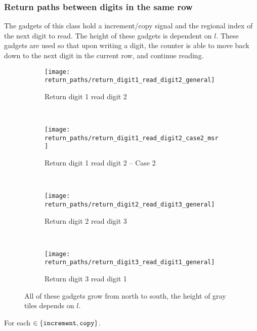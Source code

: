 \subsubsection{Return paths between digits in the same row}
The gadgets of this class hold a increment/copy signal and the regional index
of the next digit to read. The height of these gadgets is dependent on $l$.
These gadgets are used so that upon writing a digit, the counter
is able to move back down to the next digit in the current row, and continue
reading.
\vspace{1cm}

\begin{figure}[H]
    \centering
    \begin{subfigure}[t]{0.2\textwidth}
        \centering
        \texttt{[image: return\_paths/return\_digit1\_read\_digit2\_general]}
        \caption{\label{fig:return_digit1_read_digit2_general} Return digit 1 read digit 2}
    \end{subfigure}%
    ~
    \begin{subfigure}[t]{0.2\textwidth}
        \centering
        \texttt{[image: return\_paths/return\_digit1\_read\_digit2\_case2\_msr]}
        \caption{\label{fig:return_digit1_read_digit2_case2_msr} Return digit 1 read digit 2 -- Case 2}
    \end{subfigure}%
    ~
    \begin{subfigure}[t]{0.2\textwidth}
        \centering
        \texttt{[image: return\_paths/return\_digit2\_read\_digit3\_general]}
        \caption{\label{fig:return_digit2_read_digit3_general} Return digit 2 read digit 3}
    \end{subfigure}%
    ~
    \begin{subfigure}[t]{0.2\textwidth}
        \centering
        \texttt{[image: return\_paths/return\_digit3\_read\_digit1\_general]}
        \caption{\label{fig:return_digit3_read_digit1_general} Return digit 3 read digit 1}
    \end{subfigure}%
    \caption{\label{fig:return_path_same_row} All of these gadgets grow from north to south, the height of gray tiles depends on $l$.}
\end{figure}

\noindent For each {\inc} $\in \{ {\tt increment, copy } \}$.


